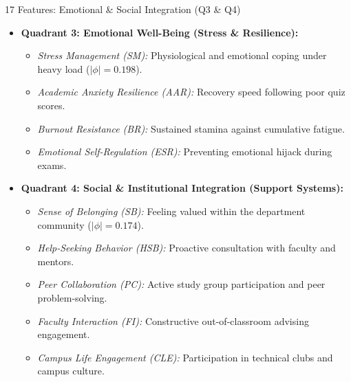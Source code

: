 \documentclass{beamer}
\begin{document}
\begin{frame}{17 Features: Emotional \& Social Integration (Q3 \& Q4)}
  \begin{itemize}\setlength{\itemsep}{3.5pt}\small
    \item \textbf{Quadrant 3: Emotional Well-Being (Stress \& Resilience):}
    \begin{itemize}\setlength{\itemsep}{1.5pt}\footnotesize
      \item \textit{Stress Management (SM):} Physiological and emotional coping under heavy load ($|\phi|=0.198$).
      \item \textit{Academic Anxiety Resilience (AAR):} Recovery speed following poor quiz scores.
      \item \textit{Burnout Resistance (BR):} Sustained stamina against cumulative fatigue.
      \item \textit{Emotional Self-Regulation (ESR):} Preventing emotional hijack during exams.
    \end{itemize}
    \item \textbf{Quadrant 4: Social \& Institutional Integration (Support Systems):}
    \begin{itemize}\setlength{\itemsep}{1.5pt}\footnotesize
      \item \textit{Sense of Belonging (SB):} Feeling valued within the department community ($|\phi|=0.174$).
      \item \textit{Help-Seeking Behavior (HSB):} Proactive consultation with faculty and mentors.
      \item \textit{Peer Collaboration (PC):} Active study group participation and peer problem-solving.
      \item \textit{Faculty Interaction (FI):} Constructive out-of-classroom advising engagement.
      \item \textit{Campus Life Engagement (CLE):} Participation in technical clubs and campus culture.
    \end{itemize}
  \end{itemize}
\end{frame}
\end{document}
